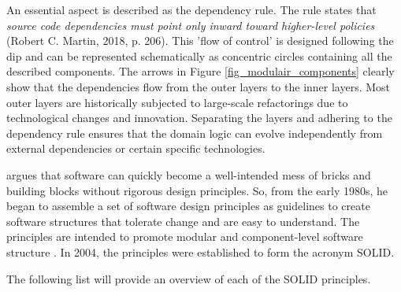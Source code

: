 An essential aspect is described as the dependency rule. The rule states that
\textit{source code dependencies must point only inward toward higher-level policies}
(Robert C. Martin, 2018, p. 206). This ’flow of control’ is designed following the
\gls{dip} and can be represented schematically as concentric circles containing all the
described components. The arrows in Figure \ref{fig_modulair_components} clearly show that
the dependencies flow from the outer layers to the inner layers. Most outer layers are
historically subjected to large-scale refactorings due to technological changes and
innovation. Separating the layers and adhering to the dependency rule ensures that the
domain logic can evolve independently from external dependencies or certain specific
technologies.

\textcite[78]{r_c_martin_clean_2018} argues that software can quickly become a
well-intended mess of bricks and building blocks without rigorous design principles. So,
from the early 1980s, he began to assemble a set of software design principles as
guidelines to create software structures that tolerate change and are easy to understand.
The principles are intended to promote modular and component-level software structure
\parencite[79]{r_c_martin_clean_2018}. In 2004, the principles were established to form
the acronym SOLID. 

The following list will provide an overview of each of the SOLID principles.

